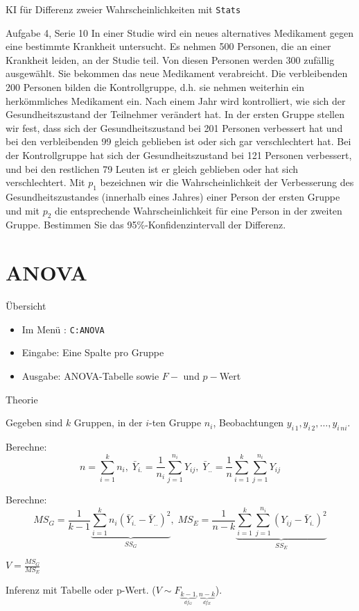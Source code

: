 \documentclass{beamer}
\newlength{\tikey}
\newcommand{\keystroke}[1]{\settowidth{\tikey}{\scriptsize #1}\psframebox[framearc=0.2]{\parbox{\tikey}{\scriptsize #1}}}
\begin{document}
\begin{frame}{KI für Differenz zweier Wahrscheinlichkeiten mit \texttt{Stats}}
\begin{beamerboxesrounded}[shadow]{Aufgabe 4, Serie 10}
\small{In einer Studie wird ein neues alternatives Medikament gegen eine bestimmte Krankheit
untersucht. Es nehmen 500 Personen, die an einer Krankheit leiden, an der Studie teil.
Von diesen Personen werden 300 zufällig ausgewählt. Sie bekommen das neue Medikament
verabreicht. Die verbleibenden 200 Personen bilden die Kontrollgruppe, d.h. sie nehmen
weiterhin ein herkömmliches Medikament ein. Nach einem Jahr wird kontrolliert, wie sich
der Gesundheitszustand der Teilnehmer verändert hat. In der ersten Gruppe stellen wir
fest, dass sich der Gesundheitszustand bei 201 Personen verbessert hat und bei den 
verbleibenden 99 gleich geblieben ist oder sich gar verschlechtert hat. Bei der Kontrollgruppe
hat sich der Gesundheitszustand bei 121 Personen verbessert, und bei den restlichen 79
Leuten ist er gleich geblieben oder hat sich verschlechtert. Mit $p_1$ bezeichnen wir die
Wahrscheinlichkeit der Verbesserung des Gesundheitszustandes (innerhalb eines Jahres)
einer Person der ersten Gruppe und mit $p_2$ die entsprechende Wahrscheinlichkeit für
eine Person in der zweiten Gruppe. Bestimmen Sie das 95\%-Konfidenzintervall der Differenz.}
\end{beamerboxesrounded}
\end{frame}

\section{ANOVA}
\begin{frame}{Übersicht}
\begin{itemize}
\item Im Menü \keystroke{F6}: \texttt{C:ANOVA}
\item Eingabe: Eine Spalte pro Gruppe
\item Ausgabe: ANOVA-Tabelle sowie $F-$ und $p-$Wert
\end{itemize}
\end{frame}

\begin{frame}{Theorie}
\begin{outline}
\item Gegeben sind $k$ Gruppen, in der $i$-ten Gruppe $n_i$, Beobachtungen
$y_{i\,1}, y_{i\,2}, \ldots, y_{i\,ni}$.
\item Berechne:
$$
n=\sum_{i=1}^k n_i,\;
\bar{Y}_{i.}=\frac{1}{n_i}\sum_{j=1}^{n_i}Y_{ij},\; 
\bar{Y}_{..}=\frac{1}{n}\sum_{i=1}^k\sum_{j=1}^{n_i}Y_{ij}
$$
\item Berechne:
$$
MS_G=\frac{1}{k-1}\underbrace{\sum_{i=1}^k n_i(\bar{Y}_{i.}-\bar{Y}_{..})^2}_{SS_G},\;
MS_E=\frac{1}{n-k}\underbrace{\sum_{i=1}^k\sum_{j=1}^{n_i}(Y_{ij}-\bar{Y}_{i.})^2}_{SS_E}
$$
\item $V=\frac{MS_G}{MS_E}$
\item Inferenz mit Tabelle oder p-Wert. ($V\sim F_{\underbrace{k-1}_{df_G},\underbrace{n-k}_{df_E}}$).
\end{outline}
\end{frame}
\end{document}
